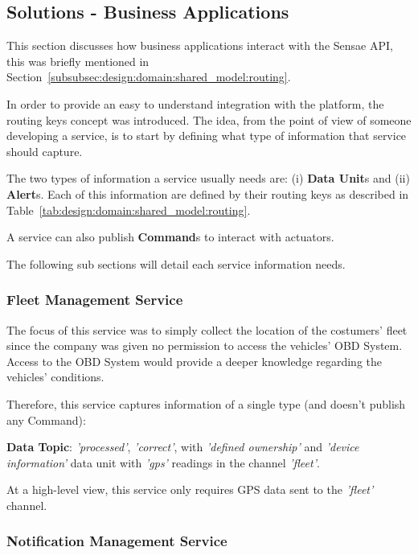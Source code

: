\subsection{Solutions - Business Applications}
\label{subsec:implementation:description:services}

This section discusses how business applications interact with the Sensae \gls{API}, this was briefly mentioned in Section~\ref{subsubsec:design:domain:shared_model:routing}.

In order to provide an easy to understand integration with the platform, the routing keys concept was introduced. The idea, from the point of view of someone developing a service, is to start by defining what type of information that service should capture.

The two types of information a service usually needs are: (i) \textbf{Data Unit}s and (ii) \textbf{Alert}s. Each of this information are defined by their routing keys as described in Table~\ref{tab:design:domain:shared_model:routing}.

A service can also publish \textbf{Command}s to interact with actuators.

The following sub sections will detail each service information needs.

\subsubsection{Fleet Management Service}
\label{subsubsec:implementation:description:services:fleet}

The focus of this service was to simply collect the location of the costumers' fleet since the company was given no permission to access the vehicles' \gls{OBD} System. Access to the \gls{OBD} System would provide a deeper knowledge regarding the vehicles' conditions.

Therefore, this service captures information of a single type (and doesn't publish any Command):

\textbf{Data Topic}: \textit{'processed'}, \textit{'correct'}, with \textit{'defined ownership'} and \textit{'device information'} data unit with \textit{'gps'} readings in the channel \textit{'fleet'}.

At a high-level view, this service only requires \gls{GPS} data sent to the \textit{'fleet'} channel.

\subsubsection{Notification Management Service}
\label{subsubsec:implementation:description:services:notification}

